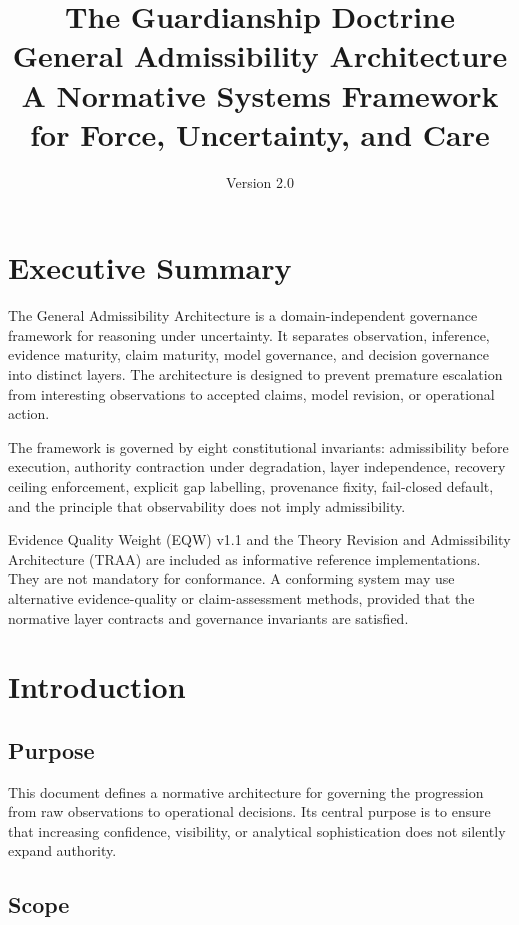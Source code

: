 \documentclass[11pt,a4paper]{article}
\title{\textbf{The Guardianship Doctrine}\\[0.5em]
\large General Admissibility Architecture\\
A Normative Systems Framework for Force, Uncertainty, and Care}
\author{}
\date{Version 2.0}
\begin{document}
\maketitle
\tableofcontents
\newpage

\section{Executive Summary}

The General Admissibility Architecture is a domain-independent governance framework for reasoning under uncertainty. It separates observation, inference, evidence maturity, claim maturity, model governance, and decision governance into distinct layers. The architecture is designed to prevent premature escalation from interesting observations to accepted claims, model revision, or operational action.

The framework is governed by eight constitutional invariants: admissibility before execution, authority contraction under degradation, layer independence, recovery ceiling enforcement, explicit gap labelling, provenance fixity, fail-closed default, and the principle that observability does not imply admissibility.

Evidence Quality Weight (EQW) v1.1 and the Theory Revision and Admissibility Architecture (TRAA) are included as informative reference implementations. They are not mandatory for conformance. A conforming system may use alternative evidence-quality or claim-assessment methods, provided that the normative layer contracts and governance invariants are satisfied.

\section{Introduction}

\subsection{Purpose}

This document defines a normative architecture for governing the progression from raw observations to operational decisions. Its central purpose is to ensure that increasing confidence, visibility, or analytical sophistication does not silently expand authority.

\subsection{Scope}
\end{document}
